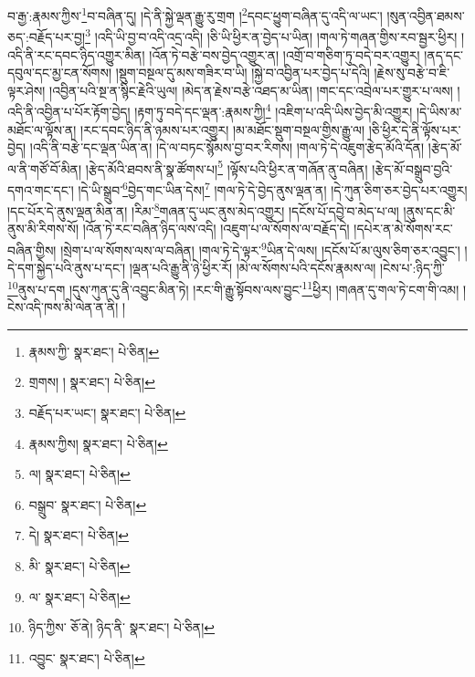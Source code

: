 བ་རྒྱ་:རྣམས་ཀྱིས་\footnote{རྣམས་ཀྱི་  སྣར་ཐང་།  པེ་ཅིན། }བ་བཞིན་དུ། །དེ་ནི་སྐྱེ་ལྡན་རྒྱུ་རུ་གྲག །\footnote{གྲགས། །  སྣར་ཐང་།  པེ་ཅིན། }དབང་ཕྱུག་བཞིན་དུ་འདི་ལ་ཡང་། །སུན་འབྱིན་ཐམས་ཅད་:བརྗོད་པར་བྱ།\footnote{བརྗོད་པར་ཡང་།  སྣར་ཐང་།  པེ་ཅིན། } །འདི་ཡི་བྱ་བ་འདི་འདྲ་འདི། །ཅི་ཡི་ཕྱིར་ན་བྱེད་པ་ཡིན། །གལ་ཏེ་གཞན་གྱིས་རབ་སྦྱར་ཕྱིར། །འདི་ནི་རང་དབང་ཉིད་འགྱུར་མིན། །འོན་ཏེ་བརྩེ་བས་བྱེད་འགྱུར་ན། །འགྲོ་བ་གཅིག་ཏུ་བདེ་བར་འགྱུར། །ནད་དང་དབུལ་དང་མྱ་ངན་སོགས། །སྡུག་བསྔལ་དུ་མས་གཟིར་བ་ཡི། །སྐྱེ་བ་འབྱིན་པར་བྱེད་པ་དེའི། །རྗེས་སུ་བརྩེ་བ་ཇི་ལྟར་ཤེས། །འབྱིན་པའི་སྔ་ན་སྙིང་རྗེའི་ཡུལ། །མེད་ན་རྗེས་བརྩེ་འཐད་མ་ཡིན། །གང་དང་འབྲེལ་པར་གྱུར་པ་ལས། །འདི་ནི་འབྱིན་པ་པོར་རྟོག་བྱེད། །རྟག་ཏུ་བདེ་དང་ལྡན་:རྣམས་ཀྱི།\footnote{རྣམས་ཀྱིས།  སྣར་ཐང་།  པེ་ཅིན། } །འཇིག་པ་འདི་ཡིས་བྱེད་མི་འགྱུར། །དེ་ཡིས་མ་མཐོང་ལ་ལྟོས་ན། །རང་དབང་ཉིད་ནི་ཉམས་པར་འགྱུར། །མ་མཐོང་སྡུག་བསྔལ་གྱིས་རྒྱུ་ལ། །ཅི་ཕྱིར་དེ་ནི་ལྟོས་པར་བྱེད། །འདི་ནི་བརྩེ་དང་ལྡན་ཡིན་ན། །དེ་ལ་བཏང་སྙོམས་བྱ་བར་རིགས། །གལ་ཏེ་དེ་འཇུག་རྩེད་མོའི་དོན། །རྩེད་མོ་ལ་ནི་གཙོ་བོ་མིན། །རྩེད་མོའི་ཐབས་ནི་སྣ་ཚོགས་པ།\footnote{ལ།  སྣར་ཐང་།  པེ་ཅིན། } །ལྟོས་པའི་ཕྱིར་ན་གཞོན་ནུ་བཞིན། །རྩེད་མོ་བསྒྲུབ་བྱའི་དགའ་གང་དང་། །དེ་ཡི་སྒྲུབ་\footnote{བསྒྲུབ་  སྣར་ཐང་།  པེ་ཅིན། }བྱེད་གང་ཡིན་དེས།\footnote{དེ།  སྣར་ཐང་།  པེ་ཅིན། } །གལ་ཏེ་དེ་བྱེད་ནུས་ལྡན་ན། །དེ་ཀུན་ཅིག་ཅར་བྱེད་པར་འགྱུར། །དང་པོར་དེ་ནུས་ལྡན་མིན་ན། །རིམ་\footnote{མི་  སྣར་ཐང་།  པེ་ཅིན། }གཞན་དུ་ཡང་ནུས་མེད་འགྱུར། །དངོས་པོ་དབྱེ་བ་མེད་པ་ལ། །ནུས་དང་མི་ནུས་མི་རིགས་སོ། །འོན་ཏེ་རང་བཞིན་ཉིད་ལས་འདི། །འཇུག་པ་ལ་སོགས་ལ་བརྗོད་དེ། །དཔེར་ན་མེ་སོགས་རང་བཞིན་གྱིས། །སྲེག་པ་ལ་སོགས་ལས་ལ་བཞིན། །གལ་ཏེ་དེ་ལྟར་\footnote{ལ་  སྣར་ཐང་།  པེ་ཅིན། }ཡིན་དེ་ལས། །དངོས་པོ་མ་ལུས་ཅིག་ཅར་འབྱུང་། །དེ་དག་སྐྱེད་པའི་ནུས་པ་དང་། །ལྡན་པའི་རྒྱུ་ནི་ཉེ་ཕྱིར་རོ། །མེ་ལ་སོགས་པའི་དངོས་རྣམས་ལ། །ངེས་པ་:ཉིད་ཀྱི་\footnote{ཉིད་ཀྱིས་  ཅོ་ནེ། ཉིད་ནི་  སྣར་ཐང་།  པེ་ཅིན། }ནུས་པ་དག །དུས་ཀུན་དུ་ནི་འབྱུང་མིན་ཏེ། །རང་གི་རྒྱུ་སྟོབས་ལས་བྱུང་\footnote{འབྱུང་  སྣར་ཐང་།  པེ་ཅིན། }ཕྱིར། །གཞན་དུ་གལ་ཏེ་ངག་གི་འམ། །ངེས་འདི་ཁས་མི་ལེན་ན་ནི། །
